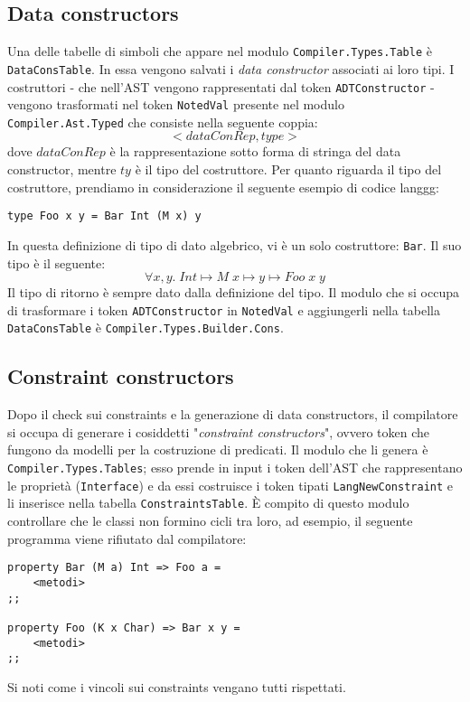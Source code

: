 \documentclass[10pt,a4paper]{article}
\begin{document}
\subsection{Data constructors}
Una delle tabelle di simboli che appare nel modulo \texttt{Compiler.Types.Table} è \texttt{DataConsTable}. In essa
vengono salvati i \textit{data constructor} associati ai loro tipi. I costruttori - che nell'AST vengono rappresentati
dal token \texttt{ADTConstructor} - vengono trasformati nel token \texttt{NotedVal} presente nel modulo
\texttt{Compiler.Ast.Typed} che consiste nella seguente coppia:
\[ < dataConRep, type > \]
dove $ dataConRep $ è la rappresentazione sotto forma di stringa del data constructor, mentre $ ty $ è il tipo del
costruttore. Per quanto riguarda il tipo del costruttore, prendiamo in considerazione il seguente esempio di codice
langgg:
\begin{lstlisting}
type Foo x y = Bar Int (M x) y
\end{lstlisting}
In questa definizione di tipo di dato algebrico, vi è un solo costruttore: \texttt{Bar}. Il suo tipo è il seguente:
\[ \forall x, y. \; Int \mapsto M \; x \mapsto y \mapsto Foo \; x \; y \]
Il tipo di ritorno è sempre dato dalla definizione del tipo. Il modulo che si occupa di trasformare i token
\texttt{ADTConstructor} in \texttt{NotedVal} e aggiungerli nella tabella \texttt{DataConsTable} è
\texttt{Compiler.Types.Builder.Cons}.

\subsection{Constraint constructors}
Dopo il check sui constraints e la generazione di data constructors, il compilatore si occupa di generare i cosiddetti
"\textit{constraint constructors}", ovvero token che fungono da modelli per la costruzione di predicati. Il modulo
che li genera è \texttt{Compiler.Types.Tables}; esso prende in input i token dell'AST che rappresentano le proprietà
(\texttt{Interface}) e da essi costruisce i token tipati \texttt{LangNewConstraint} e li inserisce nella tabella
\texttt{ConstraintsTable}. \`E compito di questo modulo controllare che le classi non formino cicli tra loro, ad
esempio, il seguente programma viene rifiutato dal compilatore:
\begin{lstlisting}
property Bar (M a) Int => Foo a =
    <metodi>
;;

property Foo (K x Char) => Bar x y =
    <metodi>
;;
\end{lstlisting}
Si noti come i vincoli sui constraints vengano tutti rispettati.
\end{document}

